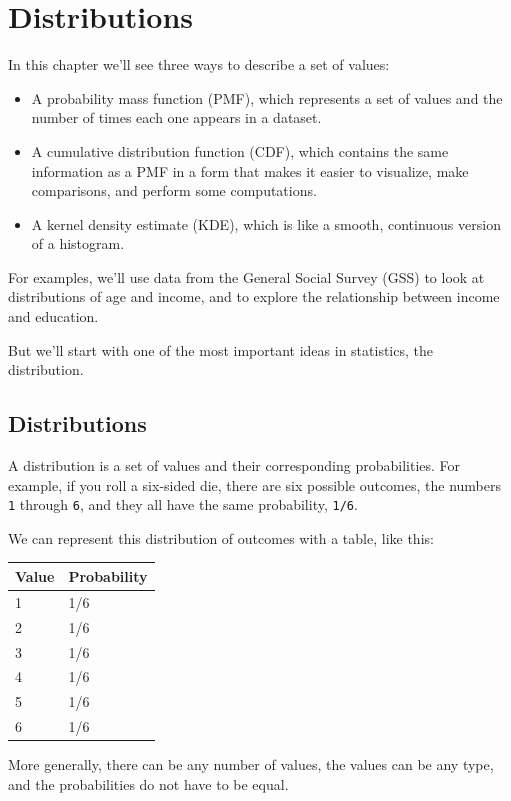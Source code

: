 \hypertarget{distributions}{%
\chapter{Distributions}\label{distributions}}

In this chapter we'll see three ways to describe a set of values:

\begin{itemize}
\item
  A probability mass function (PMF), which represents a set of values
  and the number of times each one appears in a dataset.
\item
  A cumulative distribution function (CDF), which contains the same
  information as a PMF in a form that makes it easier to visualize, make
  comparisons, and perform some computations.
\item
  A kernel density estimate (KDE), which is like a smooth, continuous
  version of a histogram.
\end{itemize}

For examples, we'll use data from the General Social Survey (GSS) to
look at distributions of age and income, and to explore the relationship
between income and education.

But we'll start with one of the most important ideas in statistics, the
distribution.

\hypertarget{distributions-1}{%
\section{Distributions}\label{distributions-1}}

A distribution is a set of values and their corresponding probabilities.
For example, if you roll a six-sided die, there are six possible
outcomes, the numbers \passthrough{\lstinline!1!} through
\passthrough{\lstinline!6!}, and they all have the same probability,
\passthrough{\lstinline!1/6!}.

We can represent this distribution of outcomes with a table, like this:

\begin{longtable}[]{@{}ll@{}}
\midrule
Value & Probability\tabularnewline
\midrule
\endhead
1 & 1/6\tabularnewline
2 & 1/6\tabularnewline
3 & 1/6\tabularnewline
4 & 1/6\tabularnewline
5 & 1/6\tabularnewline
6 & 1/6\tabularnewline
\midrule
\end{longtable}

More generally, there can be any number of values, the values can be any
type, and the probabilities do not have to be equal.


